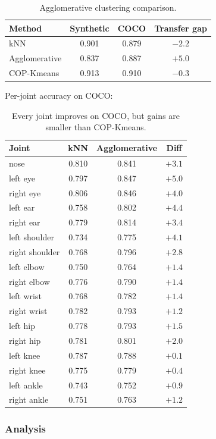 \begin{table}[H]
\centering
\footnotesize
\begin{tabular}{lccc}
\toprule
Method & Synthetic & COCO & Transfer gap \\
\midrule
kNN & 0.901 & 0.879 & $-2.2$ \\
Agglomerative & 0.837 & 0.887 & $+5.0$ \\
COP-Kmeans & 0.913 & 0.910 & $-0.3$ \\
\bottomrule
\end{tabular}
\caption{Agglomerative clustering comparison.}
\end{table}

Per-joint accuracy on COCO:

\begin{table}[H]
\centering
\footnotesize
\begin{tabular}{lccc}
\toprule
Joint & kNN & Agglomerative & Diff \\
\midrule
nose & 0.810 & 0.841 & $+3.1$ \\
left eye & 0.797 & 0.847 & $+5.0$ \\
right eye & 0.806 & 0.846 & $+4.0$ \\
left ear & 0.758 & 0.802 & $+4.4$ \\
right ear & 0.779 & 0.814 & $+3.4$ \\
left shoulder & 0.734 & 0.775 & $+4.1$ \\
right shoulder & 0.768 & 0.796 & $+2.8$ \\
left elbow & 0.750 & 0.764 & $+1.4$ \\
right elbow & 0.776 & 0.790 & $+1.4$ \\
left wrist & 0.768 & 0.782 & $+1.4$ \\
right wrist & 0.782 & 0.793 & $+1.2$ \\
left hip & 0.778 & 0.793 & $+1.5$ \\
right hip & 0.781 & 0.801 & $+2.0$ \\
left knee & 0.787 & 0.788 & $+0.1$ \\
right knee & 0.775 & 0.779 & $+0.4$ \\
left ankle & 0.743 & 0.752 & $+0.9$ \\
right ankle & 0.751 & 0.763 & $+1.2$ \\
\bottomrule
\end{tabular}
\caption{Every joint improves on COCO, but gains are smaller than COP-Kmeans.}
\end{table}


\subsubsection{Analysis}

